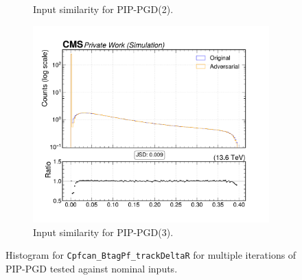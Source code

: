 \begin{figure}[htbp]
\begin{subfigure}[t]{0.32\textwidth}
    \caption*{Input similarity for PIP-PGD(2).}
  \end{subfigure}\hfill
  \begin{subfigure}[t]{0.32\textwidth}
    \includegraphics[width=\linewidth]{media/output/features/compare/combined_it_3/cmp_cpf_arr_Cpfcan_BtagPf_trackDeltaR.pdf}
    \caption*{Input similarity for PIP-PGD(3).}
  \end{subfigure}

  \caption*{Histogram for \texttt{Cpfcan\_BtagPf\_trackDeltaR} for multiple iterations of PIP-PGD tested against nominal inputs.}
  \label{fig:combined_input_Cpfcan_BtagPf_trackDeltaR}
\end{figure}


